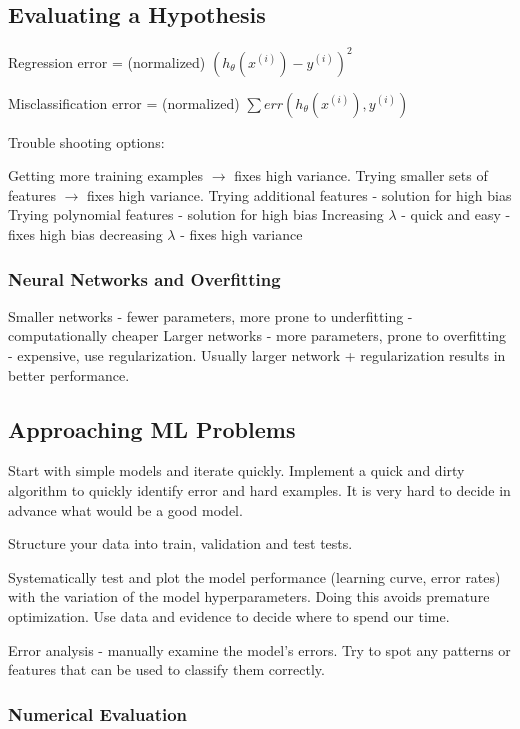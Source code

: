 \subsection{Evaluating a Hypothesis}

Regression error = (normalized) $(h_\theta(x^(i)) - y^{(i)})^2$

Misclassification error = (normalized) $\sum err (h_\theta(x^{(i)}), y^{(i)})$

Trouble shooting options:

Getting more training examples $\rightarrow$ fixes high variance.
Trying smaller sets of features $\rightarrow$ fixes high variance.
Trying additional features - solution for high bias
Trying polynomial features - solution for high bias
Increasing $\lambda$ - quick and easy - fixes high bias
decreasing $\lambda$ - fixes high variance

\subsubsection{Neural Networks and Overfitting}

Smaller networks - fewer parameters, more prone to underfitting - computationally cheaper
Larger networks - more parameters, prone to overfitting - expensive, use regularization. 
Usually larger network + regularization results in better performance.


\subsection{Approaching ML Problems}

Start with simple models and iterate quickly. 
Implement a quick and dirty algorithm to quickly identify error and hard examples.
It is very hard to decide in advance what would be a good model.

Structure your data into train, validation and test tests. 

Systematically test and plot the model performance (learning curve, error rates) with the variation of the model hyperparameters. 
Doing this avoids premature optimization. Use data and evidence to decide where to spend our time. 

Error analysis - manually examine the model's errors. Try to spot any patterns or features that can be used to classify them correctly. 


\subsubsection{Numerical Evaluation}

